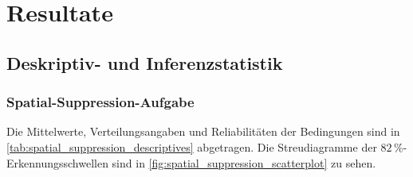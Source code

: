 \documentclass[11pt, twoside, a4paper]{book}		%
\begin{document}
\chapter{Resultate \label{cha:Resultate}}

\section{Deskriptiv- und Inferenzstatistik \label{sec:Deskriptive_Statistik}}

\subsection{Spatial-Suppression-Aufgabe \label{subsec:SSres}}

Die Mittelwerte, Verteilungsangaben und Reliabilitäten der Bedingungen sind in \autoref{tab:spatial_suppression_descriptives} abgetragen. 
Die Streudiagramme der $82\,\%$-Erkennungs\-schwel\-len sind in \autoref{fig:spatial_suppression_scatterplot} zu sehen.
\end{document}
